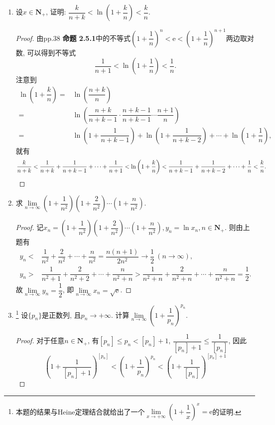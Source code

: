 \documentclass[a4paper,11pt,twoside]{ctexbook}
\newcommand{\e}{\mathrm e}
\begin{document}
\begin{enumerate}
	\item 设$x\in\mathbf{N}_{+}$, 证明: $\dfrac{k}{n+k}<\ln\left(1+\dfrac{k}{n}\right)<\dfrac{k}{n}$.
	      \begin{proof}
		      由pp.38 {\bf 命题 2.5.1}中的不等式$\left(1+\dfrac{1}{n}\right)^n<\e<\left(1+\dfrac{1}{n}\right)^{n+1}$两边取对数, 可以得到不等式
		      \[
			      \dfrac{1}{n+1}<\ln\left(1+\dfrac{1}{n}\right)<\dfrac{1}{n}.
		      \]
		      注意到
		      \[
			      \begin{split}
				      \ln\left(1+\dfrac{k}{n}\right)=&\ln\left(\dfrac{n+k}{n}\right)\\
				      =&\ln\left(\dfrac{n+k}{n+k-1}\cdot\dfrac{n+k-1}{n+k-1}\cdots\dfrac{n+1}{n}\right)\\
				      =&\ln\left(1+\dfrac{1}{n+k-1}\right)+\ln\left(1+\dfrac{1}{n+k-2}\right)+\cdots+\ln\left(1+\dfrac{1}{n}\right),
			      \end{split}
		      \]
		      就有
		      \[
			      \dfrac{k}{n+k}<\dfrac{1}{n+k}+\dfrac{1}{n+k-1}+\cdots+\dfrac{1}{n+1}<\ln\left(1+\dfrac{k}{n}\right)<\dfrac{1}{n+k-1}+\dfrac{1}{n+k-2}+\cdots+\dfrac{1}{n}<\dfrac{k}{n}.\qedhere
		      \]
	      \end{proof}
	\item 求$\lim\limits_{n\to\infty} \left(1+\dfrac{1}{n^2}\right)\left(1+\dfrac{2}{n^2}\right)\cdots\left(1+\dfrac{n}{n^2}\right)$.
	      \begin{proof}
		      记$x_n=\left(1+\dfrac{1}{n^2}\right)\left(1+\dfrac{2}{n^2}\right)\cdots\left(1+\dfrac{n}{n^2}\right), y_n=\ln{x_n}, n\in\mathbf{N}_{+}$. 则由上题有
		      \[
			      \begin{split}
				      y_n<&\dfrac{1}{n^2}+\dfrac{2}{n^2}+\cdots+\dfrac{n}{n^2}=\dfrac{n(n+1)}{2n^2}\to\dfrac{1}{2} \ (n\to\infty),\\
				      y_n>&\dfrac{1}{n^2+1}+\dfrac{2}{n^2+2}+\cdots+\dfrac{n}{n^2+n}>\dfrac{1}{n^2+n}+\dfrac{2}{n^2+n}+\cdots+\dfrac{n}{n^2+n}=\dfrac{1}{2}.
			      \end{split}
		      \]
		      故$\lim\limits_{n\to\infty} y_n=\dfrac{1}{2}$, 即$\lim\limits_{n\to\infty} x_n=\sqrt{\e}$.\qedhere
	      \end{proof}
	\item \footnote{本题的结果与Heine定理结合就给出了一个$\lim\limits_{x\to+\infty} \left(1+\dfrac{1}{x}\right)^{x}=\e$的证明.} 设$\{p_n\}$是正数列, 且$p_n\to+\infty$. 计算$\lim\limits_{n\to\infty} \left(1+\dfrac{1}{p_n}\right)^{p_n}$.
	      \begin{proof}
		      对于任意$n\in\mathbf{N}_{+}$, 有$[p_n]\leqslant p_n<[p_n]+1$, $\dfrac{1}{[p_n]+1}\leqslant\dfrac{1}{[p_n]}$, 因此
		      \[
			      \left(1+\dfrac{1}{[p_n]+1}\right)^{[p_n]}<\left(1+\dfrac{1}{p_n}\right)^{p_n}<\left(1+\dfrac{1}{[p_n]}\right)^{[p_n]+1}
		      \]


\end{proof}
\end{enumerate}
\end{document}
